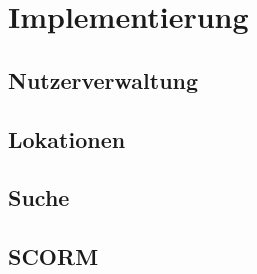 \chapter{Implementierung}\label{ref:chaptImplementation}
\section{Nutzerverwaltung}
\section{Lokationen}
\section{Suche}
\section{SCORM}

